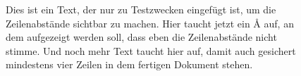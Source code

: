 \documentclass[12pt,a4paper]{scrartcl}
\begin{document}
\begin{figure}
  \centering
  \caption{Dies ist ein Text, der nur zu Testzwecken eingefügt ist, um die
    Zeilenabstände sichtbar zu machen.  Hier taucht jetzt ein \AA{}
    auf, an dem aufgezeigt werden soll, dass eben die Zeilenabstände nicht
    stimme.  Und noch mehr Text taucht hier auf, damit auch gesichert
    mindestens vier Zeilen in dem fertigen Dokument stehen.}
\end{figure}
\end{document}
